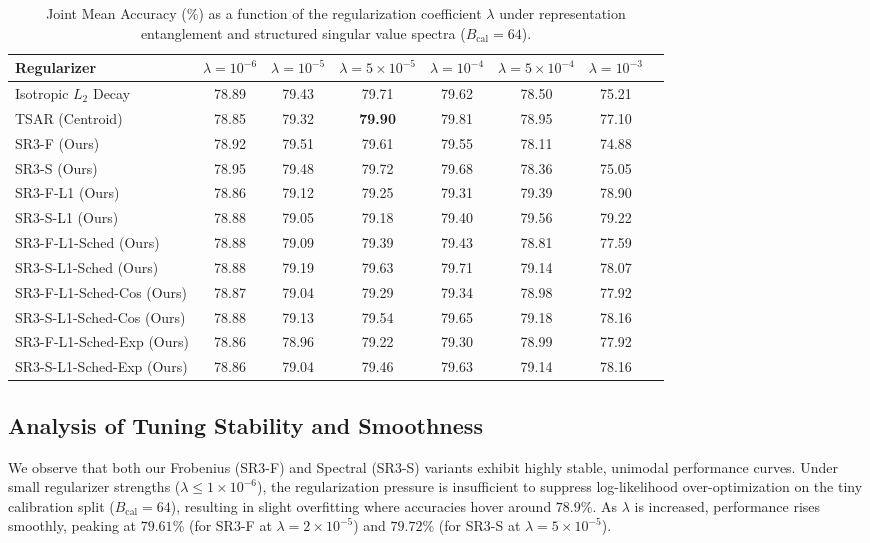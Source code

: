 \documentclass{article}
\theoremstyle{plain}
\theoremstyle{definition}
\theoremstyle{remark}
\begin{document}
\begin{table}[h]
\caption{Joint Mean Accuracy (\%) as a function of the regularization coefficient $\lambda$ under representation entanglement and structured singular value spectra ($B_{\text{cal}}=64$).}
\label{tab:sensitivity_sweep}
\vskip 0.1in
\begin{center}
\begin{small}
\begin{tabular}{lccccccr}
\toprule
Regularizer & $\lambda = 10^{-6}$ & $\lambda = 10^{-5}$ & $\lambda = 5\times 10^{-5}$ & $\lambda = 10^{-4}$ & $\lambda = 5\times 10^{-4}$ & $\lambda = 10^{-3}$ \\
\midrule
Isotropic $L_2$ Decay & 78.89 & 79.43 & 79.71 & 79.62 & 78.50 & 75.21 \\
TSAR (Centroid)       & 78.85 & 79.32 & \textbf{79.90} & 79.81 & 78.95 & 77.10 \\
\midrule
SR3-F (Ours)          & 78.92 & 79.51 & 79.61 & 79.55 & 78.11 & 74.88 \\
SR3-S (Ours)          & 78.95 & 79.48 & 79.72 & 79.68 & 78.36 & 75.05 \\
SR3-F-L1 (Ours)       & 78.86 & 79.12 & 79.25 & 79.31 & 79.39 & 78.90 \\
SR3-S-L1 (Ours)       & 78.88 & 79.05 & 79.18 & 79.40 & 79.56 & 79.22 \\
SR3-F-L1-Sched (Ours) & 78.88 & 79.09 & 79.39 & 79.43 & 78.81 & 77.59 \\
SR3-S-L1-Sched (Ours) & 78.88 & 79.19 & 79.63 & 79.71 & 79.14 & 78.07 \\
SR3-F-L1-Sched-Cos (Ours) & 78.87 & 79.04 & 79.29 & 79.34 & 78.98 & 77.92 \\
SR3-S-L1-Sched-Cos (Ours) & 78.88 & 79.13 & 79.54 & 79.65 & 79.18 & 78.16 \\
SR3-F-L1-Sched-Exp (Ours) & 78.86 & 78.96 & 79.22 & 79.30 & 78.99 & 77.92 \\
SR3-S-L1-Sched-Exp (Ours) & 78.86 & 79.04 & 79.46 & 79.63 & 79.14 & 78.16 \\
\bottomrule
\end{tabular}
\end{small}
\end{center}
\end{table}

\subsection{Analysis of Tuning Stability and Smoothness}
We observe that both our Frobenius (SR3-F) and Spectral (SR3-S) variants exhibit highly stable, unimodal performance curves. Under small regularizer strengths ($\lambda \le 1\times 10^{-6}$), the regularization pressure is insufficient to suppress log-likelihood over-optimization on the tiny calibration split ($B_{\text{cal}}=64$), resulting in slight overfitting where accuracies hover around $78.9\%$. As $\lambda$ is increased, performance rises smoothly, peaking at $79.61\%$ (for SR3-F at $\lambda = 2\times 10^{-5}$) and $79.72\%$ (for SR3-S at $\lambda = 5\times 10^{-5}$). 
\end{document}
